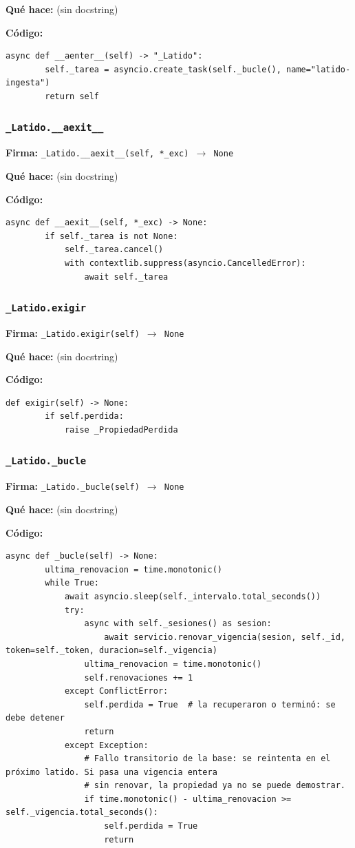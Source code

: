 \documentclass[11pt,a4paper]{article}
\begin{document}
\textbf{Qué hace:} (sin docstring)

\textbf{Código:}
\begin{lstlisting}
async def __aenter__(self) -> "_Latido":
        self._tarea = asyncio.create_task(self._bucle(), name="latido-ingesta")
        return self
\end{lstlisting}

\subsubsection*{\texttt{\_Latido.\_\_aexit\_\_}}
\textbf{Firma:} \texttt{\_Latido.\_\_aexit\_\_(self, *\_exc) $\rightarrow$ None}

\textbf{Qué hace:} (sin docstring)

\textbf{Código:}
\begin{lstlisting}
async def __aexit__(self, *_exc) -> None:
        if self._tarea is not None:
            self._tarea.cancel()
            with contextlib.suppress(asyncio.CancelledError):
                await self._tarea
\end{lstlisting}

\subsubsection*{\texttt{\_Latido.exigir}}
\textbf{Firma:} \texttt{\_Latido.exigir(self) $\rightarrow$ None}

\textbf{Qué hace:} (sin docstring)

\textbf{Código:}
\begin{lstlisting}
def exigir(self) -> None:
        if self.perdida:
            raise _PropiedadPerdida
\end{lstlisting}

\subsubsection*{\texttt{\_Latido.\_bucle}}
\textbf{Firma:} \texttt{\_Latido.\_bucle(self) $\rightarrow$ None}

\textbf{Qué hace:} (sin docstring)

\textbf{Código:}
\begin{lstlisting}
async def _bucle(self) -> None:
        ultima_renovacion = time.monotonic()
        while True:
            await asyncio.sleep(self._intervalo.total_seconds())
            try:
                async with self._sesiones() as sesion:
                    await servicio.renovar_vigencia(sesion, self._id, token=self._token, duracion=self._vigencia)
                ultima_renovacion = time.monotonic()
                self.renovaciones += 1
            except ConflictError:
                self.perdida = True  # la recuperaron o terminó: se debe detener
                return
            except Exception:
                # Fallo transitorio de la base: se reintenta en el próximo latido. Si pasa una vigencia entera
                # sin renovar, la propiedad ya no se puede demostrar.
                if time.monotonic() - ultima_renovacion >= self._vigencia.total_seconds():
                    self.perdida = True
                    return
\end{lstlisting}
\end{document}
